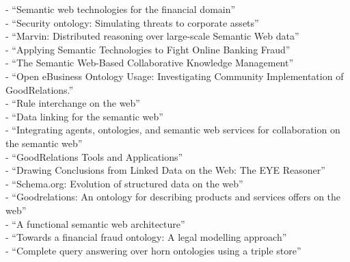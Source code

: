 - ``Semantic web technologies for the financial domain'' \citep{lara2007semantic} \\
- ``Security ontology: Simulating threats to corporate assets'' \citep{ekelhart2006security} \\
- ``Marvin: Distributed reasoning over large-scale Semantic Web data'' \citep{oren2009marvin} \\
- ``Applying Semantic Technologies to Fight Online Banking Fraud'' \citep{carvalhoapplying} \\
- ``The Semantic Web-Based Collaborative Knowledge Management'' \citep{chao2012semantic} \\
- ``Open eBusiness Ontology Usage: Investigating Community Implementation of GoodRelations.'' \citep{ashraf2011open} \\
- ``Rule interchange on the web'' \citep{boley2007rule} \\
- ``Data linking for the semantic web'' \citep{scharffe2011data} \\
- ``Integrating agents, ontologies, and semantic web services for collaboration on the semantic web'' \citep{stollberg2005integrating} \\
- ``GoodRelations Tools and Applications'' \citep{hepp2009goodrelations} \\
- ``Drawing Conclusions from Linked Data on the Web: The EYE Reasoner'' \citep{verborgh2015drawing} \\
- ``Schema.org: Evolution of structured data on the web'' \citep{guha2016schema} \\
- ``Goodrelations: An ontology for describing products and services offers on the web'' \citep{hepp2008goodrelations} \\
- ``A functional semantic web architecture'' \citep{gerber2008functional} \\
- ``Towards a financial fraud ontology: A legal modelling approach'' \citep{kingston2004towards} \\
- ``Complete query answering over horn ontologies using a triple store'' \citep{zhou2013complete} \\


